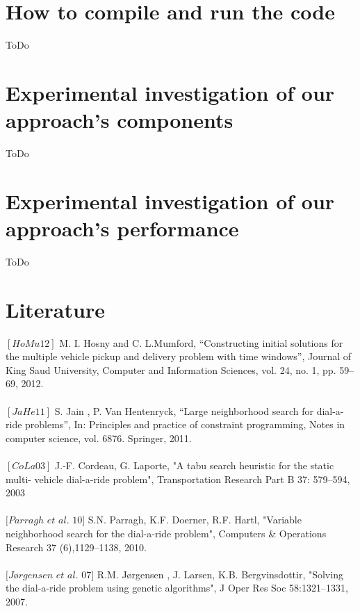 \documentclass[fleqn]{scrartcl}
\begin{document}
\section{How to compile and run the code}
ToDo
\newpage

\section{Experimental investigation of our approach's components}
ToDo
\newpage

\section{Experimental investigation of our approach's performance}
ToDo
\newpage


\section{Literature}
$[HoMu 12]$ M. I. Hosny and C. L.Mumford, “Constructing initial solutions for the multiple vehicle pickup and delivery problem with time windows”, Journal of King Saud University, Computer and Information Sciences, vol. 24, no. 1, pp. 59–69, 2012.
\\
\\
$[JaHe 11]$ S. Jain , P. Van Hentenryck, “Large neighborhood search for dial-a-ride problems”, In: Principles and practice of constraint programming, Notes in computer science, vol. 6876. Springer, 2011.
\\
\\
$[CoLa 03]$ J.-F. Cordeau, G. Laporte, "A tabu search heuristic for the static multi- vehicle dial-a-ride problem", Transportation Research Part B 37: 579–594, 2003
\\
\\
$[Parragh$  $et$  $al.$ $10]$ S.N. Parragh, K.F. Doerner, R.F. Hartl, "Variable neighborhood search for the dial-a-ride problem", Computers \& Operations Research 37 (6),1129–1138, 2010. 
\\
\\
$[Jørgensen$ $et$ $al.$ $07]$ R.M. Jørgensen , J. Larsen, K.B. Bergvinsdottir, "Solving the dial-a-ride problem using genetic algorithms", J Oper Res Soc 58:1321–1331, 2007.
\end{document}
